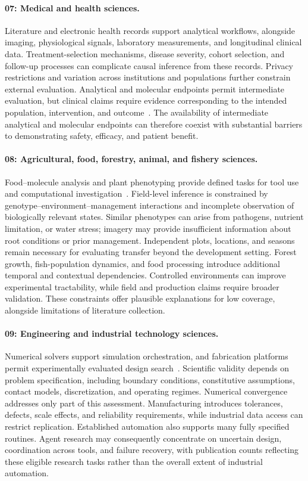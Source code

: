\paragraph{07: Medical and health sciences.}
Literature and electronic health records support analytical workflows, alongside imaging, physiological signals, laboratory measurements, and longitudinal clinical data. Treatment-selection mechanisms, disease severity, cohort selection, and follow-up processes can complicate causal inference from these records. Privacy restrictions and variation across institutions and populations further constrain external evaluation. Analytical and molecular endpoints permit intermediate evaluation, but clinical claims require evidence corresponding to the intended population, intervention, and outcome~\cite{asd0002,asd0054}. The availability of intermediate analytical and molecular endpoints can therefore coexist with substantial barriers to demonstrating safety, efficacy, and patient benefit.

\paragraph{08: Agricultural, food, forestry, animal, and fishery sciences.}
Food--molecule analysis and plant phenotyping provide defined tasks for tool use and computational investigation~\cite{asd0695,asd0510,asd0634}. Field-level inference is constrained by genotype--environment--management interactions and incomplete observation of biologically relevant states. Similar phenotypes can arise from pathogens, nutrient limitation, or water stress; imagery may provide insufficient information about root conditions or prior management. Independent plots, locations, and seasons remain necessary for evaluating transfer beyond the development setting. Forest growth, fish-population dynamics, and food processing introduce additional temporal and contextual dependencies. Controlled environments can improve experimental tractability, while field and production claims require broader validation. These constraints offer plausible explanations for low coverage, alongside limitations of literature collection.

\paragraph{09: Engineering and industrial technology sciences.}
Numerical solvers support simulation orchestration, and fabrication platforms permit experimentally evaluated design search~\cite{asd0047,asd0504}. Scientific validity depends on problem specification, including boundary conditions, constitutive assumptions, contact models, discretization, and operating regimes. Numerical convergence addresses only part of this assessment. Manufacturing introduces tolerances, defects, scale effects, and reliability requirements, while industrial data access can restrict replication. Established automation also supports many fully specified routines. Agent research may consequently concentrate on uncertain design, coordination across tools, and failure recovery, with publication counts reflecting these eligible research tasks rather than the overall extent of industrial automation.

